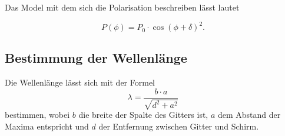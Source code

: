 Das Model mit dem sich die Polarisation beschreiben lässt lautet 

\begin{equation}
    P(\phi) = P_0 \cdot \cos\left( \phi + \delta \right)^2. 
    \label{eq:polar}
\end{equation}

\subsection{Bestimmung der Wellenlänge}

Die Wellenlänge lässt sich mit der Formel 
\begin{equation}
    \lambda = \frac{b \cdot a}{\sqrt{d^2 + a^2}}
\end{equation}
bestimmen, wobei $b$ die breite der Spalte des Gitters ist, $a$ dem Abstand der Maxima entspricht und $d$ der Entfernung zwischen Gitter und Schirm.
